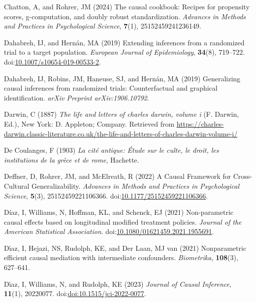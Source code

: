 \documentclass[
  single column]{article}
\newlength{\cslhangindent}
\newenvironment{CSLReferences}[2] %
 {\begin{list}{}{%
  \setlength{\itemindent}{0pt}
  \setlength{\leftmargin}{0pt}
  \setlength{\parsep}{0pt}
  \ifodd #1
   \setlength{\leftmargin}{\cslhangindent}
   \setlength{\itemindent}{-1\cslhangindent}
  \fi
  \setlength{\itemsep}{#2\baselineskip}}}
 {\end{list}}
\begin{document}
\begin{CSLReferences}{1}{0}
Chatton, A, and Rohrer, JM (2024) The causal cookbook: Recipes for
propensity scores, g-computation, and doubly robust standardization.
\emph{Advances in Methods and Practices in Psychological Science},
\textbf{7}(1), 25152459241236149.

Dahabreh, IJ, and Hernán, MA (2019) Extending inferences from a
randomized trial to a target population. \emph{European Journal of
Epidemiology}, \textbf{34}(8), 719--722.
doi:\href{https://doi.org/10.1007/s10654-019-00533-2}{10.1007/s10654-019-00533-2}.

Dahabreh, IJ, Robins, JM, Haneuse, SJ, and Hernán, MA (2019)
Generalizing causal inferences from randomized trials: Counterfactual
and graphical identification. \emph{arXiv Preprint arXiv:1906.10792}.

Darwin, C (1887) \emph{The life and letters of charles darwin, volume i}
(F. Darwin, Ed.), New York: D. Appleton; Company. Retrieved from
\url{https://charles-darwin.classic-literature.co.uk/the-life-and-letters-of-charles-darwin-volume-i/}

De Coulanges, F (1903) \emph{La cité antique: Étude sur le culte, le
droit, les institutions de la grèce et de rome}, Hachette.

Deffner, D, Rohrer, JM, and McElreath, R (2022) A Causal Framework for
Cross-Cultural Generalizability. \emph{Advances in Methods and Practices
in Psychological Science}, \textbf{5}(3), 25152459221106366.
doi:\href{https://doi.org/10.1177/25152459221106366}{10.1177/25152459221106366}.

Díaz, I, Williams, N, Hoffman, KL, and Schenck, EJ (2021) Non-parametric
causal effects based on longitudinal modified treatment policies.
\emph{Journal of the American Statistical Association}.
doi:\href{https://doi.org/10.1080/01621459.2021.1955691}{10.1080/01621459.2021.1955691}.

Dı́az, I, Hejazi, NS, Rudolph, KE, and Der Laan, MJ van (2021)
Nonparametric efficient causal mediation with intermediate confounders.
\emph{Biometrika}, \textbf{108}(3), 627--641.

Dı́az, I, Williams, N, and Rudolph, KE (2023) \emph{Journal of Causal
Inference}, \textbf{11}(1), 20220077.
doi:\href{https://doi.org/doi:10.1515/jci-2022-0077}{doi:10.1515/jci-2022-0077}.


\end{CSLReferences}
\end{document}
